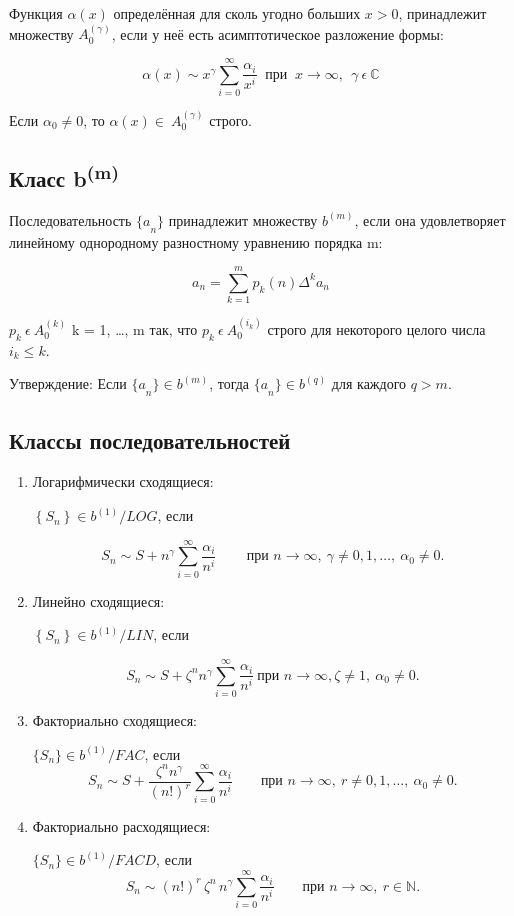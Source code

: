 \documentclass[14pt, a4paper]{extarticle}
\theoremstyle{definition}
\theoremstyle{remark}
\begin{document}
Функция $\alpha(x)$ определённая для сколь угодно больших $x > 0$,
принадлежит множеству \(A_{0}^{(\gamma)}\), если у неё есть
асимптотическое разложение формы:

\[\alpha(x)\sim x^{\gamma}\sum_{i = 0}^{\infty}\frac{\alpha_{i}}{x^{i}}\ \text{ при }\ x \rightarrow \infty,\ \ \gamma\ \epsilon\mathbb{\ C}\]

Если \(\alpha_{0} \neq 0\), то \(\alpha(x) \in \ A_{0}^{(\gamma)}\)
строго.

\subsection*{Класс b\textsuperscript{(m)}}

Последовательность \({\{ a}_{n}\}\) принадлежит множеству \(b^{(m)}\),
если она удовлетворяет линейному однородному разностному уравнению
порядка m:

\[a_{n} = \sum_{k = 1}^{m}{p_{k}(n)\Delta^{k}a_{n}}\]

\(p_{k}\ \epsilon{\ A}_{0}^{(k)}\) k = 1, \ldots, m так, что
\(p_{k}\ \epsilon\ A_{0}^{(i_{k})}\) строго для некоторого целого числа
\(i_{k} \leq k\).

Утверждение: Если \({\{ a}_{n}\} \in b^{(m)}\), тогда \({\{ a}_{n}\} \in b^{(q)}\) для каждого \(q > m\).

\subsection*{Классы последовательностей}

\begin{enumerate}
\item
  Логарифмически сходящиеся:

\(\left\{ S_{n} \right\} \in b^{(1)}/LOG\), если

\[
S_{n} \sim S 
+ n^{\gamma} \sum_{i = 0}^{\infty} \frac{\alpha_{i}}{n^{i}} \, 
\qquad \text{при } n \to \infty,\ \gamma \neq 0,1,\ldots,\ \alpha_{0} \neq 0.
\]

\item
  Линейно сходящиеся:

\(\left\{ S_{n} \right\} \in b^{(1)}/LIN\), если

\[S_{n}\sim S + \zeta^{n}n^{\gamma}\sum_{i = 0}^{\infty}\frac{\alpha_{i}}{n^{i}}\ \text{при } n \rightarrow \infty,\zeta \neq 1,\ \alpha_{0} \neq 0.\]

\item
  Факториально сходящиеся:

\(\{ S_{n} \} \in b^{(1)}/FAC\), если
\[
S_{n} \sim 
S + \frac{\zeta^{n} n^{\gamma}}{(n!)^{r}}
\sum_{i = 0}^{\infty} \frac{\alpha_{i}}{n^{i}}
\qquad \text{при } n \to \infty,\ r \neq 0,1,\ldots,\ \alpha_{0} \neq 0.
\]

\item
  Факториально расходящиеся:

\(\{ S_{n} \} \in b^{(1)}/FACD\), если
\[
S_{n} \sim 
(n!)^{r} \, \zeta^{n} \, n^{\gamma}
\sum_{i = 0}^{\infty} \frac{\alpha_{i}}{n^{i}}
\qquad \text{при } n \to \infty,\ r \in \mathbb{N}.
\]
\end{enumerate}
\end{document}
